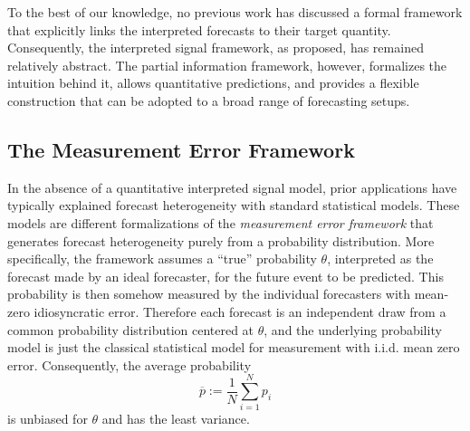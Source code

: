 \documentclass[12pt]{article}
\theoremstyle{definition}
\theoremstyle{definition}
\def\pb{\overline{p}}
\begin{document}

To the best of our knowledge, no previous work has discussed a formal framework that explicitly links the interpreted forecasts to their target quantity. Consequently, the interpreted signal framework, as proposed, has remained relatively abstract. 
The partial information framework, however, formalizes the intuition behind it, allows quantitative predictions, and provides a flexible construction that can be adopted to a broad range of forecasting setups. 

%

\subsection{The Measurement Error Framework}
\label{ss:measurement}
In the absence of a quantitative
interpreted signal model, prior applications have typically explained forecast heterogeneity  with standard statistical models. These models are different formalizations of  the \textit{measurement error framework} that generates forecast heterogeneity purely from a probability distribution. More specifically, the framework assumes a ``true'' probability
$\theta$, interpreted as the forecast made by an ideal forecaster, for the future event to be predicted. This probability is then somehow measured by the individual forecasters with mean-zero idiosyncratic error.  Therefore each forecast is an independent draw from a common
probability distribution centered at $\theta$, and the underlying probability model is just the classical statistical model for measurement with i.i.d. mean zero error.  
Consequently, the average probability $$\pb :=  \frac{1}{N} \sum_{i=1}^N
p_i $$ is unbiased for $\theta$ and has the least
variance. 
\end{document}
